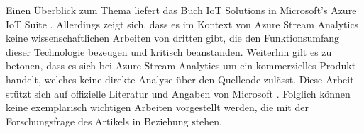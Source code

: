 Einen Überblick zum Thema liefert das Buch IoT Solutions in Microsoft's Azure IoT Suite \cite{Klein.2017}. Allerdings zeigt sich, dass es im Kontext von Azure Stream Analytics keine wissenschaftlichen Arbeiten von dritten gibt, die den Funktionsumfang dieser Technologie bezeugen und kritisch beanstanden. Weiterhin gilt es zu betonen, dass es sich bei Azure Stream Analytics um ein kommerzielles Produkt handelt, welches keine direkte Analyse über den Quellcode zulässt. Diese Arbeit stützt sich auf offizielle Literatur und Angaben von Microsoft \cite{Familiar.2017} \cite{Klein.2017}. Folglich können keine exemplarisch wichtigen Arbeiten vorgestellt werden, die mit der Forschungsfrage des Artikels in Beziehung stehen.
